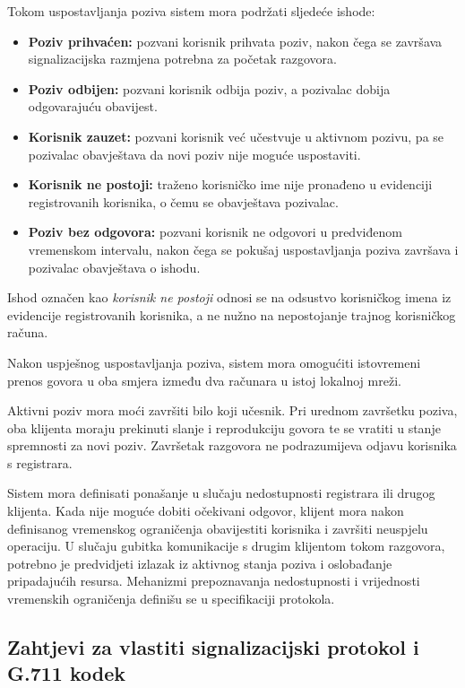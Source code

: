 Tokom uspostavljanja poziva sistem mora podržati sljedeće ishode:
\begin{itemize}
    \item \textbf{Poziv prihvaćen:} pozvani korisnik prihvata poziv, nakon čega se završava signalizacijska razmjena potrebna za početak razgovora.
    \item \textbf{Poziv odbijen:} pozvani korisnik odbija poziv, a pozivalac dobija odgovarajuću obavijest.
    \item \textbf{Korisnik zauzet:} pozvani korisnik već učestvuje u aktivnom pozivu, pa se pozivalac obavještava da novi poziv nije moguće uspostaviti.
    \item \textbf{Korisnik ne postoji:} traženo korisničko ime nije pronađeno u evidenciji registrovanih korisnika, o čemu se obavještava pozivalac.
    \item \textbf{Poziv bez odgovora:} pozvani korisnik ne odgovori u predviđenom vremenskom intervalu, nakon čega se pokušaj uspostavljanja poziva završava i pozivalac obavještava o ishodu.
\end{itemize}

Ishod označen kao \textit{korisnik ne postoji} odnosi se na odsustvo korisničkog imena iz evidencije registrovanih korisnika, a ne nužno na nepostojanje trajnog korisničkog računa.

Nakon uspješnog uspostavljanja poziva, sistem mora omogućiti istovremeni prenos govora u oba smjera između dva računara u istoj lokalnoj mreži.

Aktivni poziv mora moći završiti bilo koji učesnik. Pri urednom završetku poziva, oba klijenta moraju prekinuti slanje i reprodukciju govora te se vratiti u stanje spremnosti za novi poziv. Završetak razgovora ne podrazumijeva odjavu korisnika s registrara.

Sistem mora definisati ponašanje u slučaju nedostupnosti registrara ili drugog klijenta. Kada nije moguće dobiti očekivani odgovor, klijent mora nakon definisanog vremenskog ograničenja obavijestiti korisnika i završiti neuspjelu operaciju. U slučaju gubitka komunikacije s drugim klijentom tokom razgovora, potrebno je predvidjeti izlazak iz aktivnog stanja poziva i oslobađanje pripadajućih resursa. Mehanizmi prepoznavanja nedostupnosti i vrijednosti vremenskih ograničenja definišu se u specifikaciji protokola.

\subsection{Zahtjevi za vlastiti signalizacijski protokol i G.711 kodek}


